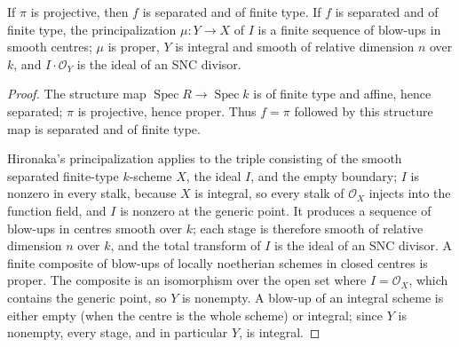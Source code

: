 \begin{lemma}
\label{lem:kn-relative-nadel-principalization}
\leanok
If $\pi$ is projective, then $f$ is separated and of finite type. If $f$ is
separated and of finite type, the principalization $\mu:Y\to X$ of $I$ is a
finite sequence of blow-ups in smooth centres; $\mu$ is proper, $Y$ is integral
and smooth of relative dimension $n$ over $k$, and $I\cdot\mathcal O_Y$ is the
ideal of an SNC divisor.
\end{lemma}
\begin{proof}
The structure map $\operatorname{Spec}R\to\operatorname{Spec}k$ is of finite
type and affine, hence separated; $\pi$ is projective, hence proper. Thus
$f=\pi$ followed by this structure map is separated and of finite type.

Hironaka's principalization applies to the triple consisting of the smooth
separated finite-type $k$-scheme $X$, the ideal $I$, and the empty boundary;
$I$ is nonzero in every stalk, because $X$ is integral, so every stalk of
$\mathcal O_X$ injects into the function field, and $I$ is nonzero at the
generic point. It produces a sequence of blow-ups in centres smooth over $k$;
each stage is therefore smooth of relative dimension $n$ over $k$, and the
total transform of $I$ is the ideal of an SNC divisor. A finite composite of
blow-ups of locally noetherian schemes in closed centres is proper. The
composite is an isomorphism over the open set where $I=\mathcal O_X$, which
contains the generic point, so $Y$ is nonempty. A blow-up of an integral
scheme is either empty (when the centre is the whole scheme) or integral;
since $Y$ is nonempty, every stage, and in particular $Y$, is integral.
\end{proof}

